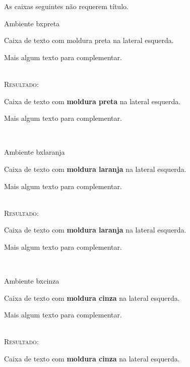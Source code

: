 \documentclass[a4paper,12pt,oneside,openright,extrafontsizes,openbib]{memoir}
\begin{document}
{As caixas seguintes não requerem título.

\begin{codex}{Ambiente bxpreta}
	\begin{bxpreta}
	Caixa de texto com moldura preta na lateral esquerda. 
	
	Mais algum texto para complementar.   
	\end{bxpreta} 
\end{codex}
\ \\

\textsc{Resultado:}
\ \\

\begin{bxpreta}
	Caixa de texto com \textbf{moldura preta} na lateral esquerda. 
	
	Mais algum texto para complementar.     
\end{bxpreta} 
\ \\

\begin{codex}{Ambiente bxlaranja}
	\begin{bxlaranja}
	Caixa de texto com \textbf{moldura laranja} na lateral esquerda.  
	
	Mais algum texto para complementar.  
	\end{bxlaranja}
\end{codex}
\ \\

\textsc{Resultado:}
\ \\

\begin{bxlaranja}
	Caixa de texto com \textbf{moldura laranja} na lateral esquerda.
	
	Mais algum texto para complementar.   
\end{bxlaranja}
\ \\

\begin{codex}{Ambiente bxcinza}
	\begin{bxcinza}
	Caixa de texto com \textbf{moldura cinza} na lateral esquerda. 
	
	Mais algum texto para complementar.  
	\end{bxcinza}
\end{codex}
\ \\ 

\textsc{Resultado:}
\ \\

\begin{bxcinza}
	Caixa de texto com \textbf{moldura cinza} na lateral esquerda. 
	

\end{bxcinza}}
\end{document}
